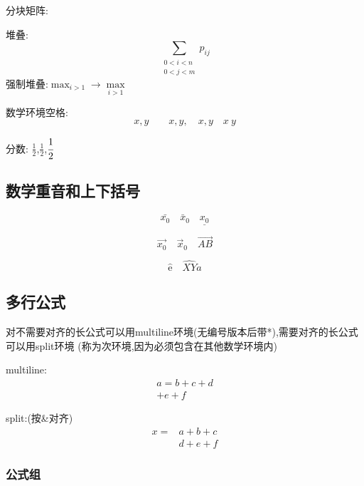 \documentclass[UTF8,a4paper,8pt,no-math]{article} %
\numberwithin{equation}{section} %
\begin{document}
分块矩阵:

堆叠:
\begin{equation*}
	\sum_{\substack{0 < i < n \\ 0 < j < m}}p_{ij}
\end{equation*}
强制堆叠:$\max_{i>1} \rightarrow \max\limits_{i>1}$

数学环境空格:
\begin{equation*}
	x,y\qquad x,y,\quad x,y \quad x~y
\end{equation*}

分数:
$\frac{1}{2}$,$\tfrac{1}{2}$,$\cfrac{1}{2}$

\subsection{数学重音和上下括号}
\begin{equation}
	\bar{x_0} \quad \bar{x}_0 \quad \underline{x_0}
\end{equation}

\begin{equation}
	\vec{x_0} \quad \vec{x}_0 \quad \overrightarrow{AB}
\end{equation}

\begin{equation}
	\hat{\mathrm{e}} \quad \widehat{XY}a
\end{equation}

\subsection{多行公式}

对不需要对齐的长公式可以用multiline环境(无编号版本后带*),需要对齐的长公式可以用split环境
(称为次环境,因为必须包含在其他数学环境内)

multiline:
\begin{multline}
	a=b+c+d \\
	+e+f
\end{multline}

split:(按\&对齐)
\begin{equation}
	\begin{split}
		x = & a+b+c\\
		& d+e+f
	\end{split}
\end{equation}

\subsubsection{公式组}
\end{document}
